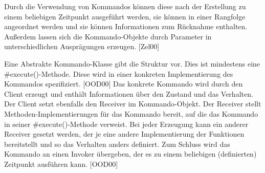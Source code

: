 Durch die Verwendung von Kommandos können diese nach der Erstellung zu einem beliebigen Zeitpunkt ausgeführt werden, sie können in einer Rangfolge angeordnet werden und sie können Informationen zum Rücknahme enthalten. Außerdem lassen sich die Kommando-Objekte durch Parameter in unterschiedlichen Ausprägungen erzeugen. [Zel00]

Eine Abstrakte Kommando-Klasse gibt die Struktur vor. Dies ist mindestens eine \#execute()-Methode. Diese wird in einer konkreten Implementierung des Kommandos spezifiziert. [OOD00]
Das konkrete Kommando wird durch den Client erzeugt und enthält Informationen über den Zustand und das Verhalten. Der Client setzt ebenfalls den Receiver im Kommando-Objekt. Der Receiver stellt Methoden-Implementierungen für das Kommando bereit, auf die das Kommando in seiner \#execute()-Methode verweist. Bei jeder Erzeugung kann ein anderer Receiver gesetzt werden, der je eine andere Implementierung der Funktionen bereitstellt und so das Verhalten anders definiert. Zum Schluss wird das Kommando an einen Invoker übergeben, der es zu einem beliebigen (definierten) Zeitpunkt ausführen kann. [OOD00]